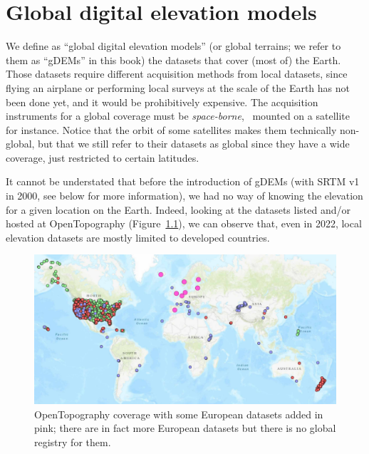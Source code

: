 
\setchapterpreamble[u]{\margintoc}
\graphicspath{{gdem/figs/}}


\chapter{Global digital elevation models}%
\label{chap:gdem}

We define as ``global digital elevation models'' (or global terrains; we refer to them as ``gDEMs'' in this book) the datasets that cover (most of) the Earth.%
Those datasets require different acquisition methods from local datasets, since flying an airplane or performing local surveys at the scale of the Earth has not been done yet, and it would be prohibitively expensive.
The acquisition instruments for a global coverage must be \emph{space-borne}, \ie\ mounted on a satellite for instance.
Notice that the orbit of some satellites makes them technically non-global, but that we still refer to their datasets as global since they have a wide coverage, just restricted to certain latitudes.

%

It cannot be understated that before the introduction of gDEMs (with SRTM v1 in 2000, see below for more information), we had no way of knowing the elevation for a given location on the Earth.
Indeed, looking at the datasets listed and/or hosted at
OpenTopography (Figure~\ref{fig:dem_coverage}), we can observe that, even in 2022, local elevation datasets are mostly limited to developed countries.
\begin{figure}
  \centering
  \includegraphics[width=\linewidth]{opentopography.pdf}
  \caption{OpenTopography coverage with some European datasets added in pink; there are in fact more European datasets but there is no global registry for them.}%
  \label{fig:dem_coverage}
\end{figure}

